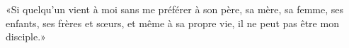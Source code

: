 \encetemps \jesusfoules
	«Si quelqu’un vient à moi sans me préférer à son père, sa mère,
	sa femme, ses enfants, ses frères et sœurs, et même à sa propre vie,
	il ne peut pas être mon disciple.»
